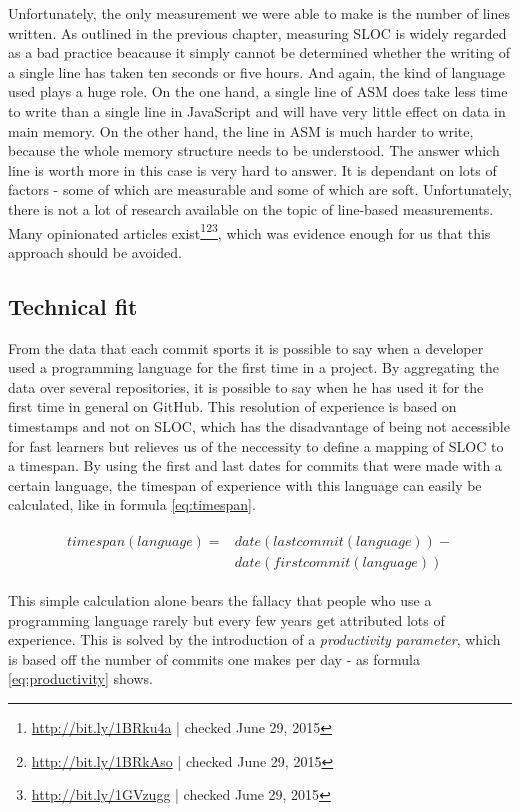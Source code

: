 Unfortunately, the only measurement we were able to make is the number of lines written. As outlined in the previous chapter, measuring SLOC is widely regarded as a bad practice beacause it simply cannot be determined whether the writing of a single line has taken ten seconds or five hours. And again, the kind of language used plays a huge role. On the one hand, a single line of ASM does take less time to write than a single line in JavaScript and will have very little effect on data in main memory. On the other hand, the line in ASM is much harder to write, because the whole memory structure needs to be understood. The answer which line is worth more in this case is very hard to answer. It is dependant on lots of factors - some of which are measurable and some of which are soft. Unfortunately, there is not a lot of research available on the topic of line-based measurements. Many opinionated articles exist\footnote{\url{http://bit.ly/1BRku4a} | checked June 29, 2015}\footnote{\url{http://bit.ly/1BRkAso} | checked June 29, 2015}\footnote{\url{http://bit.ly/1GVzugg} | checked June 29, 2015}, which was evidence enough for us that this approach should be avoided.

\subsection{Technical fit}\label{sec:technicalfit}
From the data that each commit sports it is possible to say when a developer used a programming language for the first time in a project. By aggregating the data over several repositories, it is possible to say when he has used it for the first time in general on GitHub. This resolution of experience is based on timestamps and not on SLOC, which has the disadvantage of being not accessible for fast learners but relieves us of the neccessity to define a mapping of SLOC to a timespan. By using the first and last dates for commits that were made with a certain language, the timespan of experience with this language can easily be calculated, like in formula \ref{eq:timespan}.

\begin{align}
\begin{split}\label{eq:timespan}
timespan(language) ={}& date(lastcommit(language)) - \\
                      & date(firstcommit(language))
\end{split}
\end{align}

This simple calculation alone bears the fallacy that people who use a programming language rarely but every few years get attributed lots of experience. This is solved by the introduction of a \textit{productivity parameter}, which is based off the number of commits one makes per day - as formula \ref{eq:productivity} shows.

